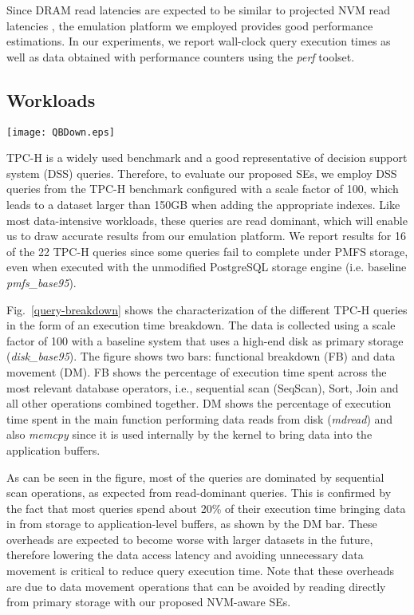Since DRAM read latencies are expected to be similar to projected NVM read latencies \cite{mittal2016survey,arulraj2015let,wang2013low,chang2012limits}, the emulation platform we employed provides good performance estimations. In our experiments, we report wall-clock query execution times as well as data obtained with performance counters using the \textit{perf} toolset. 
\subsection{Workloads}


\begin{figure*}
\centering
\texttt{[image: QBDown.eps]}
\caption{Execution time breakdown for TPCH queries in traditional DBMS with database stored in disk-storage}
\label{query-breakdown}
\end{figure*}

TPC-H \cite{council2008tpc} is a widely used benchmark and a good representative of decision support system
(DSS) queries. Therefore, to evaluate our proposed SEs, we employ DSS queries from the TPC-H benchmark configured with a scale factor of 100, which leads to a dataset larger than 150GB when adding the appropriate
indexes. Like most data-intensive workloads, these queries are read dominant, which will enable us to draw accurate results from our emulation platform. We report results for 16 of the 22 TPC-H queries since some queries fail to complete under PMFS storage, even when executed with the unmodified PostgreSQL storage engine (i.e. baseline \textit{pmfs\_base95}).

Fig.~\ref{query-breakdown} shows the characterization of the different TPC-H queries in the form of an execution 
time breakdown. The data is collected using a scale factor of 100 with a baseline system that uses a high-end disk as primary storage 
(\textit{disk\_base95}).  The  figure shows two bars: 
functional breakdown (FB) and data movement (DM). FB shows 
the percentage of execution 
time spent across the most relevant database operators, i.e., sequential scan (SeqScan), Sort, Join and all other operations
combined together. DM shows the percentage of execution time spent in the main function performing data reads from 
disk (\textit{mdread}) and also \textit{memcpy} since it is used internally by the kernel to bring data into the application buffers.

As can be seen in the figure, most of the queries are dominated
by sequential scan operations, as expected from read-dominant queries.
This is confirmed by the fact
that most queries spend about 20\% of their execution time bringing
data in from storage to application-level buffers, as shown by
the DM bar.  These overheads are expected to become worse with larger datasets in the future, therefore
lowering the data access latency and avoiding unnecessary data movement is
critical to reduce query execution time. Note that these overheads are due to
data movement operations that can be avoided by reading directly from primary storage with our proposed NVM-aware SEs.
